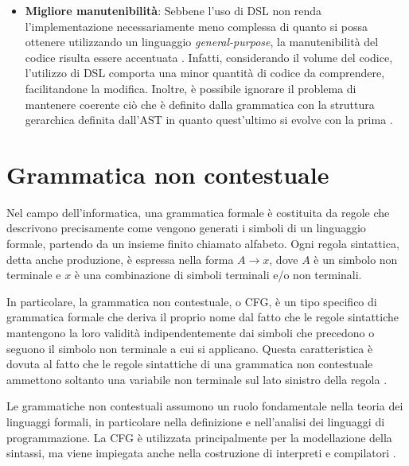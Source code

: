 \documentclass[12pt,a4paper,openright,twoside]{book}
\begin{document}
\begin{itemize}
    all'architettura del nostro terminale''\footnote{Di seguito riportata l'affermazione citata, in lingua originale:``the quality of the 
    generated code is clearly better, simply because the modelling language was designed to fit our terminal architecture''}. Inoltre, 
    l'offuscamento della reale complessità del problema, dovuto all'utilizzo di \ac{DSL}, consente ai nuovi sviluppatori di lavorare ad un 
    alto livello d'astrazione, senza dover conoscere tutti i dettagli inerenti all'implementazione del linguaggio \cite{EADS}. 
    \item \textbf{Migliore manutenibilità}: Sebbene l'uso di \ac{DSL} non renda l'implementazione necessariamente meno complessa di quanto 
    si possa ottenere utilizzando un linguaggio \textit{general-purpose}, la manutenibilità del codice risulta essere accentuata 
    \cite{Klint2010}.  Infatti, considerando il volume del codice, l'utilizzo di \ac{DSL} comporta una minor quantità di codice da comprendere, 
    facilitandone la modifica. Inoltre, è possibile  ignorare il problema di mantenere coerente ciò che è definito dalla grammatica con la 
    struttura gerarchica definita dall'\ac{AST} in quanto quest'ultimo si evolve con la prima \cite{Brabrand2010}.
\end{itemize}

\section{Grammatica non contestuale}
Nel campo dell’informatica, una grammatica formale è costituita da regole che descrivono precisamente come vengono generati i simboli di un 
linguaggio formale, partendo da un insieme finito chiamato alfabeto. Ogni regola sintattica, detta anche produzione, è espressa nella forma 
$A \rightarrow x$, dove $A$ è un simbolo non terminale e $x$ è una combinazione di simboli terminali e/o non terminali.

In particolare, la grammatica non contestuale, o \ac{CFG}, è un tipo specifico di grammatica formale che deriva il proprio nome dal fatto che 
le regole sintattiche mantengono la loro validità indipendentemente dai simboli che precedono o seguono il simbolo non terminale a cui si 
applicano. Questa caratteristica è dovuta al fatto che le regole sintattiche di una grammatica non contestuale ammettono soltanto una variabile 
non terminale sul lato sinistro della regola \cite{Linz2022}.

Le grammatiche non contestuali assumono un ruolo fondamentale nella teoria dei linguaggi formali, in particolare nella definizione e nell’analisi 
dei linguaggi di programmazione. La \ac{CFG} è utilizzata principalmente per la modellazione della sintassi, ma viene impiegata anche nella 
costruzione di interpreti e compilatori \cite{Linz2022}.
\end{document}
